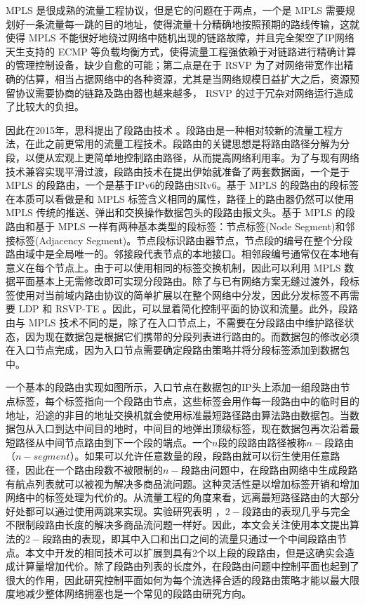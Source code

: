 \gls*{MPLS} 是很成熟的流量工程协议，但是它的问题在于两点，一个是 \gls*{MPLS} 需要规划好一条流量每一跳的目的地址，使得流量十分精确地按照预期的路线传输，这就使得 \gls*{MPLS} 不能很好地绕过网络中随机出现的链路故障，并且完全架空了IP网络天生支持的 \gls*{ECMP} 等负载均衡方式，使得流量工程强依赖于对链路进行精确计算的管理控制设备，缺少自愈的可能；第二点是在于 \gls*{RSVP} 为了对网络带宽作出精确的估算，相当占据网络中的各种资源，尤其是当网络规模日益扩大之后，资源预留协议需要协商的链路及路由器也越来越多， \gls*{RSVP} 的过于冗杂对网络运行造成了比较大的负担。

因此在2015年，思科提出了段路由技术 \cite{SRARK}。段路由是一种相对较新的流量工程方法，在此之前更常用的流量工程技术。段路由的关键思想是将路由路径分解为分段，以便从宏观上更简单地控制路由路径，从而提高网络利用率。为了与现有网络技术兼容实现平滑过渡，段路由技术在提出伊始就准备了两套数据面，一个是于 \gls*{MPLS} 的段路由，一个是基于IPv6的段路由SRv6。基于 \gls*{MPLS} 的段路由的段标签在本质可以看做是和 \gls*{MPLS} 标签含义相同的属性，路径上的路由器仍然可以使用 \gls*{MPLS} 传统的推送、弹出和交换操作数据包头的段路由报文头。基于 \gls*{MPLS} 的段路由和基于 \gls*{MPLS} 一样有两种基本类型的段标签：节点标签(Node Segment)和邻接标签(Adjacency Segment)。节点段标识路由器节点，节点段的编号在整个分段路由域中是全局唯一的。邻接段代表节点的本地接口。相邻段编号通常仅在本地有意义在每个节点上。由于可以使用相同的标签交换机制，因此可以利用 \gls*{MPLS} 数据平面基本上无需修改即可实现分段路由。除了与已有网络方案无缝过渡外，段标签使用对当前域内路由协议的简单扩展以在整个网络中分发，因此分发标签不再需要 \gls*{LDP} 和 \gls*{RSVP-TE} 。因此，可以显着简化控制平面的协议和流量。此外，段路由与 \gls*{MPLS} 技术不同的是，除了在入口节点上，不需要在分段路由中维护路径状态，因为现在数据包是根据它们携带的分段列表进行路由的。而数据包的修改必须在入口节点完成，因为入口节点需要确定段路由策略并将分段标签添加到数据包中。

一个基本的段路由实现如图所示，入口节点在数据包的IP头上添加一组段路由节点标签，每个标签指向一个段路由节点，这些标签会用作每一段路由中的临时目的地址，沿途的非目的地址交换机就会使用标准最短路径路由算法路由数据包。当数据包从入口到达中间目的地时，中间目的地弹出顶级标签，现在数据包再次沿着最短路径从中间节点路由到下一个段的端点。一个$n$段的段路由路径被称$n-$段路由（$n-segment$）。如果可以允许任意数量的段，段路由就可以衍生使用任意路径，因此在一个路由段数不被限制的$n-$段路由问题中，在段路由网络中生成段路有航点列表就可以被视为解决多商品流问题。这种灵活性是以增加标签开销和增加网络中的标签处理为代价的。从流量工程的角度来看，远离最短路径路由的大部分好处都可以通过使用两跳来实现。实验研究表明 \cite{SIDLENGTHANALYSIS} \cite{SIDLENGTHPROVE} ，$2-$段路由的表现几乎与完全不限制段路由长度的解决多商品流问题一样好。因此，本文会关注使用本文提出算法的$2-$段路由的表现，即其中入口和出口之间的流量只通过一个中间段路由节点。本文中开发的相同技术可以扩展到具有2个以上段的段路由，但是这确实会造成计算量增加代价。除了段路由列表的长度外，在段路由问题中控制平面也起到了很大的作用，因此研究控制平面如何为每个流选择合适的段路由策略才能以最大限度地减少整体网络拥塞也是一个常见的段路由研究方向。

